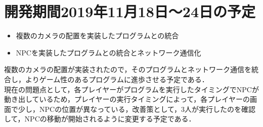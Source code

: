 \documentclass{jarticle}
\begin{document}
\section{開発期間2019年11月18日〜24日の予定}
\begin{itemize}
  \item 複数のカメラの配置を実装したプログラムとの統合
  \item NPCを実装したプログラムとの統合とネットワーク通信化
\end{itemize}

\hspace{3mm}複数のカメラの配置が実装されたので，そのプログラムとネットワーク通信を統合し，よりゲーム性のあるプログラムに進歩させる予定である．
\\\hspace{3mm}現在の問題点として，各プレイヤーがプログラムを実行したタイミングでNPCが動き出しているため，プレイヤーの実行タイミングによって，各プレイヤーの画面で少し，NPCの位置が異なっている，改善策として，3人が実行したのを確認して，NPCの移動が開始されるように変更する予定である．
\end{document}

